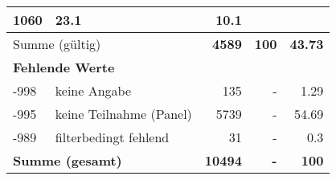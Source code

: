 \begin{longtable}{lXrrr}
       \num{1060} &
       \num[round-mode=places,round-precision=2]{23,1} &
         \num[round-mode=places,round-precision=2]{10,1} \\
     \midrule
     \multicolumn{2}{l}{Summe (gültig)} &
       \textbf{\num{4589}} &
     \textbf{100} &
       \textbf{\num[round-mode=places,round-precision=2]{43,73}} \\
     \multicolumn{5}{l}{\textbf{Fehlende Werte}}\\
       -998 &
       keine Angabe &
         \num{135} &
        - &
         \num[round-mode=places,round-precision=2]{1,29} \\
       -995 &
       keine Teilnahme (Panel) &
         \num{5739} &
        - &
         \num[round-mode=places,round-precision=2]{54,69} \\
       -989 &
       filterbedingt fehlend &
         \num{31} &
        - &
         \num[round-mode=places,round-precision=2]{0,3} \\
     \midrule
     \multicolumn{2}{l}{\textbf{Summe (gesamt)}} &
          \textbf{\num{10494}} &
        \textbf{-} &
        \textbf{100} \\
     \bottomrule
     \end{longtable}
     
